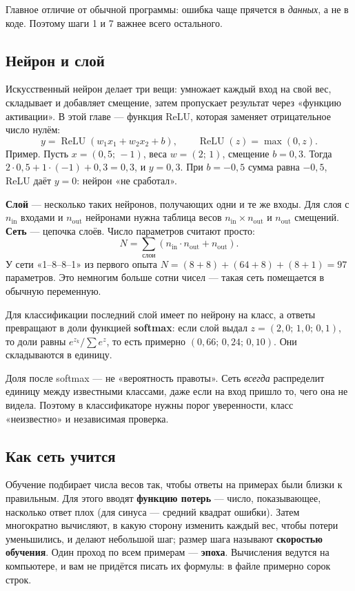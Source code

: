 Главное отличие от обычной программы: ошибка чаще прячется в \emph{данных}, а не в коде.
Поэтому шаги 1 и 7 важнее всего остального.

\subsection{Нейрон и слой}

Искусственный нейрон делает три вещи: умножает каждый вход на свой вес, складывает и добавляет
смещение, затем пропускает результат через «функцию активации». В этой главе --- функция ReLU,
которая заменяет отрицательное число нулём:
\[
y = \operatorname{ReLU}(w_1x_1 + w_2x_2 + b),\qquad \operatorname{ReLU}(z)=\max(0,z).
\]
Пример. Пусть $x=(0{,}5;\,-1)$, веса $w=(2;\,1)$, смещение $b=0{,}3$. Тогда
$2\cdot0{,}5 + 1\cdot(-1) + 0{,}3 = 0{,}3$, и $y = 0{,}3$. При $b=-0{,}5$ сумма равна $-0{,}5$,
ReLU даёт $y=0$: нейрон «не сработал».

\textbf{Слой} --- несколько таких нейронов, получающих одни и те же входы. Для слоя с $n_\text{in}$
входами и $n_\text{out}$ нейронами нужна таблица весов $n_\text{in}\times n_\text{out}$ и $n_\text{out}$
смещений. \textbf{Сеть} --- цепочка слоёв. Число параметров считают просто:
\[
N = \sum_{\text{слои}} (n_\text{in}\cdot n_\text{out} + n_\text{out}).
\]
У сети «1--8--8--1» из первого опыта $N=(8+8)+(64+8)+(8+1)=97$ параметров. Это немногим больше
сотни чисел --- такая сеть помещается в обычную переменную.

Для классификации последний слой имеет по нейрону на класс, а ответы превращают в доли функцией
\textbf{softmax}: если слой выдал $z=(2{,}0;\,1{,}0;\,0{,}1)$, то доли равны
$e^{z_k}/\sum e^{z}$, то есть примерно $(0{,}66;\,0{,}24;\,0{,}10)$. Они складываются в единицу.

\begin{caution}
Доля после softmax --- не «вероятность правоты». Сеть \emph{всегда} распределит единицу между известными
классами, даже если на вход пришло то, чего она не видела. Поэтому в классификаторе нужны
порог уверенности, класс «неизвестно» и независимая проверка.
\end{caution}

\subsection{Как сеть учится}

Обучение подбирает числа весов так, чтобы ответы на примерах были близки к правильным.
Для этого вводят \textbf{функцию потерь} --- число, показывающее, насколько ответ плох (для
синуса --- средний квадрат ошибки). Затем многократно вычисляют, в какую сторону изменить каждый вес,
чтобы потери уменьшились, и делают небольшой шаг; размер шага называют \textbf{скоростью обучения}.
Один проход по всем примерам --- \textbf{эпоха}. Вычисления ведутся на компьютере,
и вам не придётся писать их формулы: в файле  примерно сорок строк.

